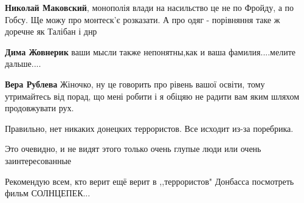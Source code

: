 \begin{itemize}
\begin{itemize}
\textbf{Николай Маковский}, монополія влади на насильство це не по Фройду, а по Гобсу. Ще можу про монтеск'є розказати.
А про одяг - порівняння таке ж доречне як Талібан і днр

 
\textbf{Дима Жовнерик} ваши мысли также непонятны,как и ваша фамилия....мелите дальше....

 
\textbf{Вера Рублева} Жіночко, ну це говорить про рівень вашої освіти, тому утримайтесь від порад, що мені робити і я обіцяю не радити вам яким шляхом продовжувати рух.
\end{itemize}

 
Правильно, нет никаких донецких террористов. Все исходит из-за поребрика.

 
Это очевидно, и не видят этого только очень глупые люди или очень заинтересованные

 
Рекомендую всем, кто верит ещё верит в ,,террористов" Донбасса посмотреть фильм СОЛНЦЕПЕК...



\end{itemize}
